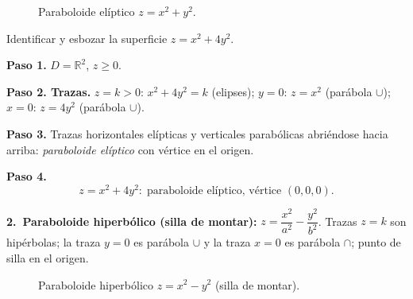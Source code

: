 \begin{figure}[!htbp]
\centering
{}
\caption{Paraboloide elíptico $z=x^2+y^2$.}
\label{fig:paraboloide_eliptico}
\end{figure}

\begin{example}
Identificar y esbozar la superficie $z = x^2 + 4y^2$.
\begin{myproof}
\textbf{Paso 1.} $D=\mathbb{R}^2$, $z\ge 0$.

\textbf{Paso 2. Trazas.}
$z=k>0$: $x^2+4y^2=k$ (elipses);
$y=0$: $z=x^2$ (parábola $\cup$);
$x=0$: $z=4y^2$ (parábola $\cup$).

\textbf{Paso 3.} Trazas horizontales elípticas y verticales parabólicas
abriéndose hacia arriba: \emph{paraboloide elíptico} con vértice en el
origen.

\textbf{Paso 4.}
\[\boxed{z=x^2+4y^2:\;\text{paraboloide elíptico, vértice }(0,0,0).}\]
\end{myproof}
\end{example}

\medskip
\noindent\textbf{2.\ Paraboloide hiperbólico (silla de montar):}
$z=\dfrac{x^2}{a^2}-\dfrac{y^2}{b^2}$.
Trazas $z=k$ son hipérbolas; la traza $y=0$ es parábola $\cup$ y la
traza $x=0$ es parábola $\cap$; punto de silla en el origen.

\begin{figure}[!htbp]
\centering
{}
\caption{Paraboloide hiperbólico $z=x^2-y^2$ (silla de montar).}
\label{fig:paraboloide_hiperbolico}
\end{figure}

